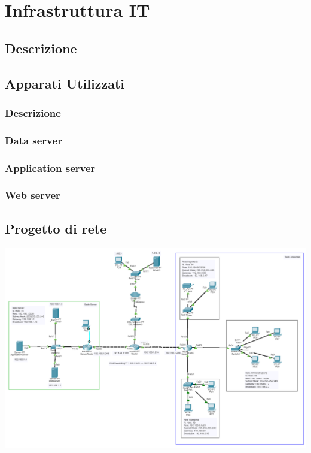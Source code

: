 \section{Infrastruttura IT}
\subsection{Descrizione}
\subsection{Apparati Utilizzati}
\subsubsection{Descrizione}
\subsubsection{Data server}
\subsubsection{Application server}
\subsubsection{Web server}
\subsection{Progetto di rete}
\begin{center}
    \includegraphics[scale=.4]{images/rete.png}
\end{center}